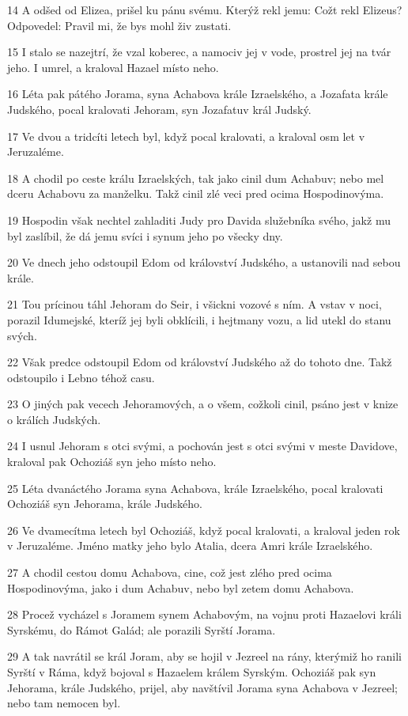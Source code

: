 \par 14 A odšed od Elizea, prišel ku pánu svému. Kterýž rekl jemu: Cožt rekl Elizeus? Odpovedel: Pravil mi, že bys mohl živ zustati.
\par 15 I stalo se nazejtrí, že vzal koberec, a namociv jej v vode, prostrel jej na tvár jeho. I umrel, a kraloval Hazael místo neho.
\par 16 Léta pak pátého Jorama, syna Achabova krále Izraelského, a Jozafata krále Judského, pocal kralovati Jehoram, syn Jozafatuv král Judský.
\par 17 Ve dvou a tridcíti letech byl, když pocal kralovati, a kraloval osm let v Jeruzaléme.
\par 18 A chodil po ceste králu Izraelských, tak jako cinil dum Achabuv; nebo mel dceru Achabovu za manželku. Takž cinil zlé veci pred ocima Hospodinovýma.
\par 19 Hospodin však nechtel zahladiti Judy pro Davida služebníka svého, jakž mu byl zaslíbil, že dá jemu svíci i synum jeho po všecky dny.
\par 20 Ve dnech jeho odstoupil Edom od království Judského, a ustanovili nad sebou krále.
\par 21 Tou prícinou táhl Jehoram do Seir, i všickni vozové s ním. A vstav v noci, porazil Idumejské, kteríž jej byli obklícili, i hejtmany vozu, a lid utekl do stanu svých.
\par 22 Však predce odstoupil Edom od království Judského až do tohoto dne. Takž odstoupilo i Lebno téhož casu.
\par 23 O jiných pak vecech Jehoramových, a o všem, cožkoli cinil, psáno jest v knize o králích Judských.
\par 24 I usnul Jehoram s otci svými, a pochován jest s otci svými v meste Davidove, kraloval pak Ochoziáš syn jeho místo neho.
\par 25 Léta dvanáctého Jorama syna Achabova, krále Izraelského, pocal kralovati Ochoziáš syn Jehorama, krále Judského.
\par 26 Ve dvamecítma letech byl Ochoziáš, když pocal kralovati, a kraloval jeden rok v Jeruzaléme. Jméno matky jeho bylo Atalia, dcera Amri krále Izraelského.
\par 27 A chodil cestou domu Achabova, cine, což jest zlého pred ocima Hospodinovýma, jako i dum Achabuv, nebo byl zetem domu Achabova.
\par 28 Procež vycházel s Joramem synem Achabovým, na vojnu proti Hazaelovi králi Syrskému, do Rámot Galád; ale porazili Syrští Jorama.
\par 29 A tak navrátil se král Joram, aby se hojil v Jezreel na rány, kterýmiž ho ranili Syrští v Ráma, když bojoval s Hazaelem králem Syrským. Ochoziáš pak syn Jehorama, krále Judského, prijel, aby navštívil Jorama syna Achabova v Jezreel; nebo tam nemocen byl.

